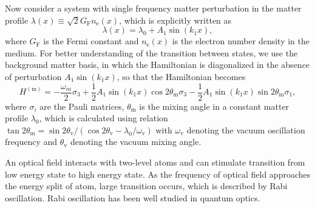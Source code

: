 \documentclass[%
reprint,
 amsmath,amssymb,
 aps,
]{revtex4-1}
\begin{document}
Now consider a system with single frequency matter perturbation in the matter profile $\lambda(x)\equiv\sqrt{2}G_{\mathrm F} n_{\mathrm e}(x)$, which is explicitly written as
\begin{equation}
    \lambda(x) = \lambda_0 + A_1 \sin (k_1 x) ,
    \label{single-frequency-matter-profile}
\end{equation}
where $G_{\mathrm F}$ is the Fermi constant and $n_{\mathrm e}(x)$ is the electron number density in the medium. For better understanding of the transition between states, we use the background matter basis, in which the Hamiltonian is diagonalized in the absence of perturbation $A_1\sin(k_1 x)$, so that the Hamiltonian becomes
\begin{equation}
    H^{(\mathrm{m})} = -\frac{\omega_m}{2} \sigma_3 + \frac{1}{2} A_1 \sin (k_1 x) \cos 2\theta_{\mathrm m} \sigma_3 -\frac{1}{2} A_1  \sin(k_1 x) \sin 2\theta_{\mathrm m} \sigma_1,\label{neutrino-matter-single-frequency-hamiltonian}
\end{equation}
where $\sigma_i$ are the Pauli matrices, $\theta_{\mathrm m}$ is the mixing angle in a constant matter profile $\lambda_0$, which is calculated using relation $\tan 2\theta_{\mathrm{m}}=\sin 2\theta_{\mathrm v}/\left( \cos 2\theta_{\mathrm v} - \lambda_0/\omega_{\mathrm v} \right)$ with $\omega_{\mathrm v}$ denoting the vacuum oscillation frequency and $\theta_{\mathrm v}$ denoting the vacuum mixing angle.







An optical field interacts with two-level atoms and can stimulate transition from low energy state to high energy state. As the frequency of optical field approaches the energy split of atom, large transition occurs, which is described by Rabi oscillation. Rabi oscillation has been well studied in quantum optics.\cite{Boyd2008} 
\end{document}
